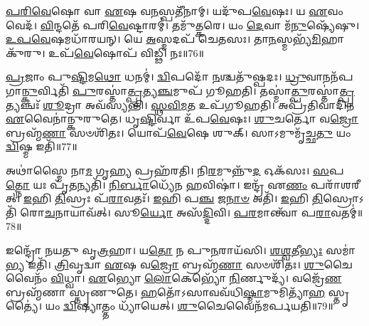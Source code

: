 \-\ul{𑌪}\-\-\ul{𑌰𑌿}\-\-\ul{𑌵𑍇}\-𑌷𑍋 𑌵𑌾 \ul{𑌏}\-𑌷 𑌵\-\ul{𑌨}\-𑌸𑍍𑌪𑌤𑍀᳴𑌨𑌾𑌮𑍍।
𑌯𑌦𑍁᳴𑌪\-\ul{𑌵𑍇}\-𑌷𑌃।
𑌯 \ul{𑌏}\-𑌵𑌂 𑌵𑍇𑌦᳴।
\-\ul{𑌵𑌿}\-𑌨𑍍𑌦𑌤𑍇᳴ 𑌪𑌰𑌿\-\ul{𑌵𑍇}\-𑌷𑍍𑌟𑌾𑌰𑌮𑍍॑।
𑌤𑌮𑍁᳴\-\ul{𑌤𑍍𑌕}\-𑌰𑍇।
𑌯𑌂 \ul{𑌦𑍇}\-𑌵𑌾 𑌮᳴\-\ul{𑌨𑍁}\-𑌷𑍍𑌯𑍇᳴𑌷𑍁।
\-\ul{𑌉}\-\-\ul{𑌪}\-\-\ul{𑌵𑍇}\-𑌷𑌮𑌧𑌾᳴𑌰𑌯𑌨𑍍।
𑌯𑍇 \ul{𑌅}\-𑌸𑍍𑌮𑌦𑌪᳴ 𑌚𑍇𑌤𑌸𑌃।
𑌤𑌾\-\ul{𑌨}\-𑌸𑍍𑌮𑌭𑍍𑌯᳴\-\ul{𑌮𑌿}\-𑌹𑌾 𑌕𑍁᳴𑌰𑍁।
𑌉𑌪᳴\-\ul{𑌵𑍇}\-𑌷𑍋𑌪᳴ 𑌵𑌿𑌡𑍍𑌢𑌿 𑌨𑌃॥76॥

\-\ul{𑌪𑍍𑌰}\-𑌜𑌾𑌂 𑌪𑍁\-\ul{𑌷𑍍𑌟𑌿}\-𑌮\-\ul{𑌥𑍋} 𑌧𑌨𑌮𑍍॑।
\-\ul{𑌦𑍍𑌵𑌿}\-𑌪𑌦𑍋᳴ \ul{𑌨}\-𑌶𑍍𑌚𑌤𑍁᳴𑌷𑍍𑌪𑌦𑌃।
\-\ul{𑌧𑍍𑌰𑍁}\-𑌵𑌾𑌨𑌨᳴𑌪\-𑌗𑌾\-\ul{𑌨𑍍𑌕𑍁}\-𑌰𑍍𑌵𑌿𑌤𑌿᳴ \ul{𑌪𑍁}\-𑌰𑌸𑍍𑌤𑌾॑\-\ul{𑌤𑍍𑌪𑍍𑌰}\-𑌤𑍍𑌯\-\ul{𑌞𑍍𑌚}\-𑌮𑍁𑌪᳴ 𑌗𑍂𑌹𑌤𑌿।
𑌤𑌸𑍍𑌮𑌾॑\-\ul{𑌤𑍍𑌪𑍁}\-𑌰\-𑌸𑍍𑌤𑌾॑\-\ul{𑌤𑍍𑌪𑍍𑌰}\-𑌤𑍍𑌯𑌞𑍍𑌚𑌃᳴ \ul{𑌶𑍂}\-𑌦𑍍𑌰𑌾 𑌅𑌵᳴𑌸𑍍𑌯𑌨𑍍𑌤𑌿।
\-\ul{𑌸𑍍𑌥}\-\-\ul{𑌵𑌿}\-\-\ul{𑌮}\-𑌤 𑌉𑌪᳴𑌗𑍂𑌹𑌤𑌿।
𑌅𑌪𑍍𑌰᳴𑌤𑌿𑌵𑌾𑌦𑌿𑌨 \ul{𑌏}\-𑌵𑍈𑌨𑌾॑𑌨𑍍𑌕𑍁𑌰𑍁𑌤𑍇।
𑌧𑍃\-\ul{𑌷𑍍𑌟𑌿}\-𑌰𑍍𑌵𑌾 𑌉᳴𑌪\-\ul{𑌵𑍇}\-𑌷𑌃।
\-\ul{𑌶𑍁}\-𑌚𑌰𑍍𑌤𑍋 𑌵\-\ul{𑌜𑍍𑌰𑍋} 𑌬𑍍𑌰𑌹𑍍𑌮᳴\-\ul{𑌣𑌾} 𑌸𑍞𑌶𑌿᳴𑌤𑌃।
𑌯𑍋𑌪᳴\-\ul{𑌵𑍇}\-𑌷𑍇 𑌶𑍁𑌕𑍍।
𑌸𑌾𑌽𑌮𑍁𑌮𑍃᳴𑌚𑍍𑌛\-\ul{𑌤𑍁} 𑌯𑌂 \ul{𑌦𑍍𑌵𑌿}\-𑌷𑍍𑌮 𑌇𑌤𑌿᳴॥77॥

𑌅𑌥𑌾॑𑌸𑍍𑌮𑍈 𑌨𑌾\-\ul{𑌮} 𑌗𑍃\-\ul{𑌹𑍍𑌯} 𑌪𑍍𑌰𑌹᳴𑌰𑌤𑌿।
𑌨𑌿\-\ul{𑌰}\-𑌮𑍁𑌨𑍍𑌨𑍁᳴\-\ul{𑌦} 𑌓𑌕᳴𑌸𑌃।
\-\ul{𑌸}\-𑌪\-\ul{𑌤𑍍𑌨𑍋} 𑌯𑌃 𑌪𑍃᳴\-\ul{𑌤}\-𑌨𑍍𑌯𑌤𑌿᳴।
\-\ul{𑌨𑌿}\-\-\ul{𑌰𑍍𑌬𑌾}\-𑌧𑍍𑌯𑍇᳴𑌨 \ul{𑌹}\-𑌵𑌿𑌷𑌾॑।
𑌇𑌨𑍍𑌦𑍍𑌰᳴ 𑌏\-\ul{𑌣𑌂} 𑌪𑌰𑌾᳴𑌶𑌰𑍀𑌤𑍍।
\-\ul{𑌇}\-𑌹𑌿 \ul{𑌤𑌿}\-𑌸𑍍𑌰𑌃 𑌪᳴\-\ul{𑌰𑌾}\-𑌵𑌤𑌃᳴।
\-\ul{𑌇}\-𑌹𑌿 𑌪\-\ul{𑌞𑍍𑌚} 𑌜\-\ul{𑌨𑌾}\-\-\ul{𑍞} 𑌅𑌤𑌿᳴।
\-\ul{𑌇}\-𑌹𑌿 \ul{𑌤𑌿}\-𑌸𑍍𑌰𑍋𑌽𑌤𑌿᳴ 𑌰𑍋\-\ul{𑌚}\-𑌨𑌾𑌯𑌾𑌵᳴𑌤𑍍।
𑌸𑍂\-\ul{𑌰𑍍𑌯𑍋} 𑌅𑌸᳴\-\ul{𑌦𑍍𑌦𑌿}\-𑌵𑌿।
\-\ul{𑌪}\-\-\ul{𑌰}\-𑌮𑌾𑌨𑍍𑌤𑍍𑌵𑌾᳴ 𑌪\-\ul{𑌰𑌾}\-𑌵𑌤𑌮𑍍॑॥78॥

𑌇𑌨𑍍𑌦𑍍𑌰𑍋᳴ 𑌨𑌯𑌤𑍁 𑌵𑍃\-\ul{𑌤𑍍𑌰}\-𑌹𑌾।
𑌯\-\ul{𑌤𑍋} 𑌨 𑌪𑍁\-\ul{𑌨}\-𑌰𑌾𑌯᳴𑌸𑌿।
\-\ul{𑌶}\-\-\ul{𑌶𑍍𑌵}\-𑌤𑍀\-\ul{𑌭𑍍𑌯𑌃} 𑌸𑌮𑌾॑\-\ul{𑌭𑍍𑌯} 𑌇𑌤𑌿᳴।
\-\ul{𑌤𑍍𑌰𑌿}\-𑌵𑍃𑌦𑍍𑌵𑌾 \ul{𑌏}\-𑌷 𑌵\-\ul{𑌜𑍍𑌰𑍋} 𑌬𑍍𑌰𑌹𑍍𑌮᳴\-\ul{𑌣𑌾} 𑌸𑍞𑌶𑌿᳴𑌤𑌃।
\-\ul{𑌶𑍁}\-𑌚𑍈𑌵𑍈𑌨𑌂᳴ \ul{𑌵𑌿}\-𑌧𑍍𑌵𑌾।
\-\ul{𑌏}\-𑌭𑍍𑌯𑍋 \ul{𑌲𑍋}\-𑌕𑍇𑌭𑍍𑌯𑍋᳴ \ul{𑌨𑌿}\-𑌰𑍍𑌣𑍁𑌦𑍍𑌯᳴।
𑌵𑌜𑍍𑌰𑍇᳴\-\ul{𑌣} 𑌬𑍍𑌰𑌹𑍍𑌮᳴𑌣𑌾 𑌸𑍍𑌤𑍃𑌣𑍁𑌤𑍇।
\-\ul{𑌹}\-𑌤𑍋᳴\-𑌽𑌸𑌾𑌵𑌵᳴𑌧𑌿\-\ul{𑌷𑍍𑌮𑌾}\-𑌮𑍁𑌮𑌿𑌤𑍍𑌯𑌾᳴\-\ul{𑌹} 𑌸𑍍𑌤𑍃𑌤𑍍𑌯𑍈॑।
𑌯𑌂 \ul{𑌦𑍍𑌵𑌿}\-𑌷𑍍𑌯𑌾𑌤𑍍𑌤𑌂 𑌧𑍍𑌯𑌾᳴𑌯𑍇𑌤𑍍।
\-\ul{𑌶𑍁}\-𑌚𑍈𑌵𑍈𑌨᳴𑌮𑌰𑍍𑌪𑌯𑌤𑌿॥79॥




\clearpage
{}
\setcounter{anuvakam}{0}


